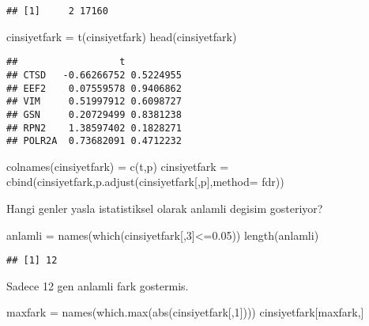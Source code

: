 \documentclass[
]{book}
\newenvironment{Shaded}{\begin{snugshade}}{\end{snugshade}}
\newcommand{\AttributeTok}[1]{\textcolor[rgb]{0.77,0.63,0.00}{#1}}
\newcommand{\DecValTok}[1]{\textcolor[rgb]{0.00,0.00,0.81}{#1}}
\newcommand{\FloatTok}[1]{\textcolor[rgb]{0.00,0.00,0.81}{#1}}
\newcommand{\FunctionTok}[1]{\textcolor[rgb]{0.00,0.00,0.00}{#1}}
\newcommand{\NormalTok}[1]{#1}
\newcommand{\OtherTok}[1]{\textcolor[rgb]{0.56,0.35,0.01}{#1}}
\newcommand{\SpecialCharTok}[1]{\textcolor[rgb]{0.00,0.00,0.00}{#1}}
\newcommand{\StringTok}[1]{\textcolor[rgb]{0.31,0.60,0.02}{#1}}
\begin{document}
\begin{verbatim}
## [1]     2 17160
\end{verbatim}

\begin{Shaded}
\begin{Highlighting}[]
\NormalTok{cinsiyetfark }\OtherTok{=} \FunctionTok{t}\NormalTok{(cinsiyetfark)}
\FunctionTok{head}\NormalTok{(cinsiyetfark)}
\end{Highlighting}
\end{Shaded}

\begin{verbatim}
##                  t          
## CTSD   -0.66266752 0.5224955
## EEF2    0.07559578 0.9406862
## VIM     0.51997912 0.6098727
## GSN     0.20729499 0.8381238
## RPN2    1.38597402 0.1828271
## POLR2A  0.73682091 0.4712232
\end{verbatim}

\begin{Shaded}
\begin{Highlighting}[]
\FunctionTok{colnames}\NormalTok{(cinsiyetfark) }\OtherTok{=} \FunctionTok{c}\NormalTok{(}\StringTok{\textquotesingle{}t\textquotesingle{}}\NormalTok{,}\StringTok{\textquotesingle{}p\textquotesingle{}}\NormalTok{)}
\NormalTok{cinsiyetfark }\OtherTok{=} \FunctionTok{cbind}\NormalTok{(cinsiyetfark,}\FunctionTok{p.adjust}\NormalTok{(cinsiyetfark[,}\StringTok{\textquotesingle{}p\textquotesingle{}}\NormalTok{],}\AttributeTok{method=} \StringTok{\textquotesingle{}fdr\textquotesingle{}}\NormalTok{))}
\end{Highlighting}
\end{Shaded}

Hangi genler yasla istatistiksel olarak anlamli degisim gosteriyor?

\begin{Shaded}
\begin{Highlighting}[]
\NormalTok{anlamli }\OtherTok{=} \FunctionTok{names}\NormalTok{(}\FunctionTok{which}\NormalTok{(cinsiyetfark[,}\DecValTok{3}\NormalTok{]}\SpecialCharTok{\textless{}=}\FloatTok{0.05}\NormalTok{))}
\FunctionTok{length}\NormalTok{(anlamli)}
\end{Highlighting}
\end{Shaded}

\begin{verbatim}
## [1] 12
\end{verbatim}

Sadece 12 gen anlamli fark gostermis.

\begin{Shaded}
\begin{Highlighting}[]
\NormalTok{maxfark }\OtherTok{=} \FunctionTok{names}\NormalTok{(}\FunctionTok{which.max}\NormalTok{(}\FunctionTok{abs}\NormalTok{(cinsiyetfark[,}\DecValTok{1}\NormalTok{])))}
\NormalTok{cinsiyetfark[maxfark,]}
\end{Highlighting}
\end{Shaded}
\end{document}
